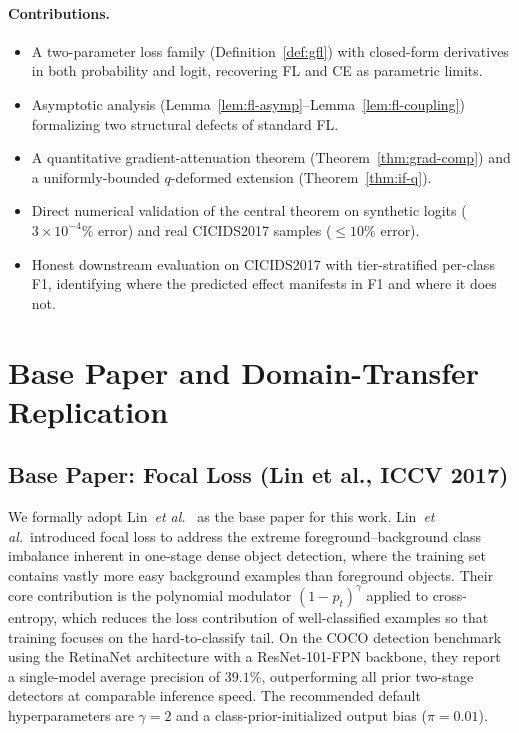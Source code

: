 \documentclass[conference]{IEEEtran}
\theoremstyle{definition}
\begin{document}
\paragraph{Contributions.}
\begin{itemize}
\item A two-parameter loss family (Definition~\ref{def:gfl}) with closed-form derivatives in both probability and logit, recovering FL and CE as parametric limits.
\item Asymptotic analysis (Lemma~\ref{lem:fl-asymp}--Lemma~\ref{lem:fl-coupling}) formalizing two structural defects of standard FL.
\item A quantitative gradient-attenuation theorem (Theorem~\ref{thm:grad-comp}) and a uniformly-bounded $q$-deformed extension (Theorem~\ref{thm:if-q}).
\item Direct numerical validation of the central theorem on synthetic logits ($3 \times 10^{-4}\%$ error) and real CICIDS2017 samples ($\le 10\%$ error).
\item Honest downstream evaluation on CICIDS2017 with tier-stratified per-class F1, identifying where the predicted effect manifests in F1 and where it does not.
\end{itemize}

\section{Base Paper and Domain-Transfer Replication}
\label{sec:base-paper}

\subsection{Base Paper: Focal Loss (Lin et al., ICCV 2017)}

We formally adopt Lin~\emph{et al.}~\cite{lin2017focal} as the base paper for this work. Lin~\emph{et al.}\ introduced focal loss to address the extreme foreground--background class imbalance inherent in one-stage dense object detection, where the training set contains vastly more easy background examples than foreground objects. Their core contribution is the polynomial modulator $(1-p_t)^\gamma$ applied to cross-entropy, which reduces the loss contribution of well-classified examples so that training focuses on the hard-to-classify tail. On the COCO detection benchmark using the RetinaNet architecture with a ResNet-101-FPN backbone, they report a single-model average precision of $39.1\%$, outperforming all prior two-stage detectors at comparable inference speed. The recommended default hyperparameters are $\gamma = 2$ and a class-prior-initialized output bias ($\pi = 0.01$).
\end{document}
